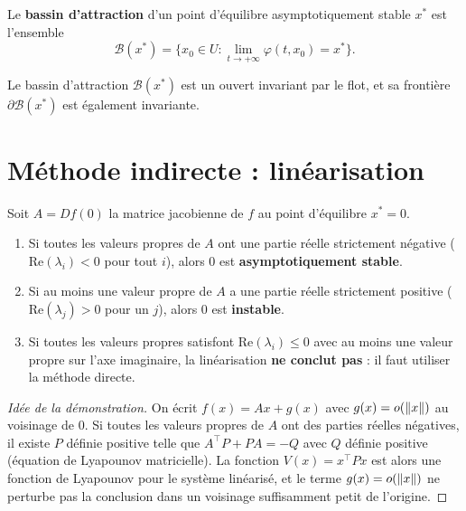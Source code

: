 \begin{definition}
Le \textbf{bassin d'attraction} d'un point d'\'equilibre asymptotiquement
stable $x^*$ est l'ensemble
\[
    \mathcal{B}(x^*) = \{x_0 \in U : \lim_{t \to +\infty} \varphi(t, x_0) = x^*\}.
\]
\end{definition}

\begin{proposition}
Le bassin d'attraction $\mathcal{B}(x^*)$ est un ouvert invariant par le flot,
et sa fronti\`ere $\partial\mathcal{B}(x^*)$ est \'egalement invariante.
\end{proposition}

\section{M\'ethode indirecte : lin\'earisation}

\begin{theoreme}
\label{thm:lyap-indirect}
Soit $A = Df(0)$ la matrice jacobienne de $f$ au point d'\'equilibre $x^* = 0$.
\begin{enumerate}
    \item Si toutes les valeurs propres de $A$ ont une partie r\'eelle
    strictement n\'egative ($\text{Re}(\lambda_i) < 0$ pour tout $i$),
    alors $0$ est \textbf{asymptotiquement stable}.
    \item Si au moins une valeur propre de $A$ a une partie r\'eelle
    strictement positive ($\text{Re}(\lambda_j) > 0$ pour un $j$),
    alors $0$ est \textbf{instable}.
    \item Si toutes les valeurs propres satisfont $\text{Re}(\lambda_i) \leq 0$
    avec au moins une valeur propre sur l'axe imaginaire, la lin\'earisation
    \textbf{ne conclut pas} : il faut utiliser la m\'ethode directe.
\end{enumerate}
\end{theoreme}

\begin{proof}[Id\'ee de la d\'emonstration]
On \'ecrit $f(x) = Ax + g(x)$ avec $g(x) = o(\left\| x \right\|)$ au voisinage de $0$.
Si toutes les valeurs propres de $A$ ont des parties r\'eelles n\'egatives,
il existe $P$ d\'efinie positive telle que $A^\top P + PA = -Q$ avec $Q$
d\'efinie positive (\'equation de Lyapounov matricielle). La fonction
$V(x) = x^\top P x$ est alors une fonction de Lyapounov pour le syst\`eme
lin\'earis\'e, et le terme $g(x) = o(\left\| x \right\|)$ ne perturbe pas la conclusion
dans un voisinage suffisamment petit de l'origine.
\end{proof}

